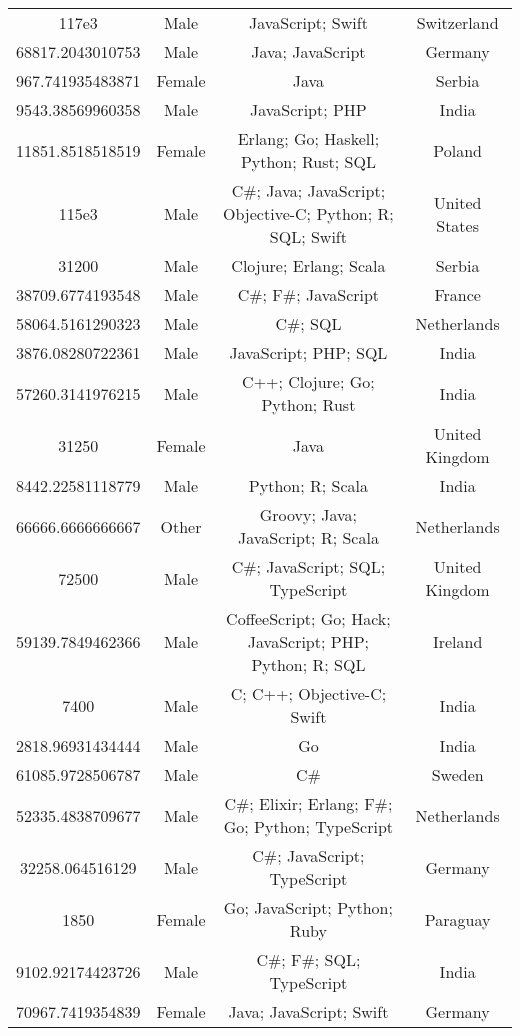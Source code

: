 \begin{center}
\begin{tabular}{ |c|c|c|c| }
117e3  &  Male  &  JavaScript; Swift  &  Switzerland  \\ 
68817.2043010753  &  Male  &  Java; JavaScript  &  Germany  \\ 
967.741935483871  &  Female  &  Java  &  Serbia  \\ 
9543.38569960358  &  Male  &  JavaScript; PHP  &  India  \\ 
11851.8518518519  &  Female  &  Erlang; Go; Haskell; Python; Rust; SQL  &  Poland  \\ 
115e3  &  Male  &  C\#; Java; JavaScript; Objective-C; Python; R; SQL; Swift  &  United States  \\ 
31200  &  Male  &  Clojure; Erlang; Scala  &  Serbia  \\ 
38709.6774193548  &  Male  &  C\#; F\#; JavaScript  &  France  \\ 
58064.5161290323  &  Male  &  C\#; SQL  &  Netherlands  \\ 
3876.08280722361  &  Male  &  JavaScript; PHP; SQL  &  India  \\ 
57260.3141976215  &  Male  &  C++; Clojure; Go; Python; Rust  &  India  \\ 
31250  &  Female  &  Java  &  United Kingdom  \\ 
8442.22581118779  &  Male  &  Python; R; Scala  &  India  \\ 
66666.6666666667  &  Other  &  Groovy; Java; JavaScript; R; Scala  &  Netherlands  \\ 
72500  &  Male  &  C\#; JavaScript; SQL; TypeScript  &  United Kingdom  \\ 
59139.7849462366  &  Male  &  CoffeeScript; Go; Hack; JavaScript; PHP; Python; R; SQL  &  Ireland  \\ 
7400  &  Male  &  C; C++; Objective-C; Swift  &  India  \\ 
2818.96931434444  &  Male  &  Go  &  India  \\ 
61085.9728506787  &  Male  &  C\#  &  Sweden  \\ 
52335.4838709677  &  Male  &  C\#; Elixir; Erlang; F\#; Go; Python; TypeScript  &  Netherlands  \\ 
32258.064516129  &  Male  &  C\#; JavaScript; TypeScript  &  Germany  \\ 
1850  &  Female  &  Go; JavaScript; Python; Ruby  &  Paraguay  \\ 
9102.92174423726  &  Male  &  C\#; F\#; SQL; TypeScript  &  India  \\ 
70967.7419354839  &  Female  &  Java; JavaScript; Swift  &  Germany  \\ 

\end{tabular}
\end{center}

